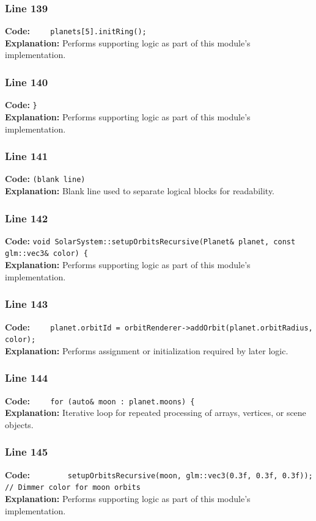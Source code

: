 \documentclass[11pt,a4paper]{article}
\begin{document}
\subsubsection*{Line 139}
\textbf{Code:} \verb|    planets[5].initRing();|\\
\textbf{Explanation:} Performs supporting logic as part of this module's implementation.

\subsubsection*{Line 140}
\textbf{Code:} \verb|}|\\
\textbf{Explanation:} Performs supporting logic as part of this module's implementation.

\subsubsection*{Line 141}
\textbf{Code:} \texttt{(blank line)}\\
\textbf{Explanation:} Blank line used to separate logical blocks for readability.

\subsubsection*{Line 142}
\textbf{Code:} \verb|void SolarSystem::setupOrbitsRecursive(Planet& planet, const glm::vec3& color) {|\\
\textbf{Explanation:} Performs supporting logic as part of this module's implementation.

\subsubsection*{Line 143}
\textbf{Code:} \verb|    planet.orbitId = orbitRenderer->addOrbit(planet.orbitRadius, color);|\\
\textbf{Explanation:} Performs assignment or initialization required by later logic.

\subsubsection*{Line 144}
\textbf{Code:} \verb|    for (auto& moon : planet.moons) {|\\
\textbf{Explanation:} Iterative loop for repeated processing of arrays, vertices, or scene objects.

\subsubsection*{Line 145}
\textbf{Code:} \verb|        setupOrbitsRecursive(moon, glm::vec3(0.3f, 0.3f, 0.3f)); // Dimmer color for moon orbits|\\
\textbf{Explanation:} Performs supporting logic as part of this module's implementation.
\end{document}
